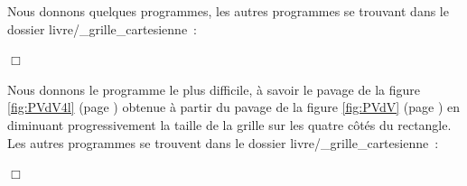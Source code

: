 \clearpage
\begin{corrige}{
\renewcommand{\carrenoir}{\hspace{-4mm}\rule{1.5mm}{1.5mm}\hspace{2.5mm}}
Nous donnons quelques programmes, les autres programmes se trouvant dans le dossier
{\idt livre/\_grille\_cartesienne}~:


\renewcommand{\carrenoir}{}
\noindent $\Box$}\end{corrige}
\begin{corrige}{
Nous donnons le programme le plus difficile, à savoir le pavage de la figure
\ref{fig:PVdV4l} (page \pageref{fig:PVdV4l}) obtenue à
partir du pavage de la figure \ref{fig:PVdV} (page \pageref{fig:PVdV}) en diminuant pro\-gres\-si\-ve\-ment la tail\-le de la gril\-le sur les 
qua\-tre côtés du rectangle. Les autres programmes se trouvent
dans le dossier {\idt livre/\_grille\_cartesienne}~:

\noindent $\Box$}\end{corrige}

